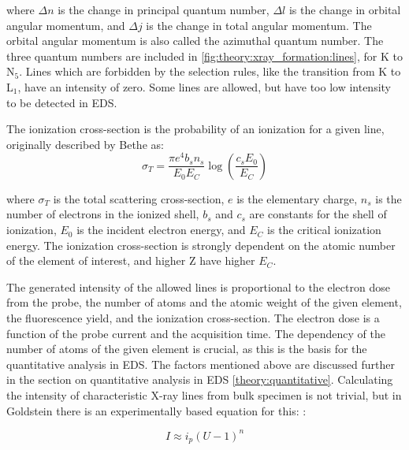 where $\Delta n$ is the change in principal quantum number, $\Delta l$ is the change in orbital angular momentum, and $\Delta j$ is the change in total angular momentum.
The orbital angular momentum is also called the azimuthal quantum number.
The three quantum numbers are included in \cref{fig:theory:xray_formation:lines}, for K to N$_5$.
Lines which are forbidden by the selection rules, like the transition from K to L$_1$, have an intensity of zero.
Some lines are allowed, but have too low intensity to be detected in EDS.


The ionization cross-section is the probability of an ionization for a given line, originally described by Bethe \cite{inokuti_on_bethe_1971} as:
\begin{equation}
    \label{eq:ionizationcrosssection}
    \sigma_T = \frac{\pi e^4 b_s n_s}{E_0 E_C}  \log\left(\frac{c_s E_0}{E_C}\right)
\end{equation}

where $\sigma_T$ is the total scattering cross-section, $e$ is the elementary charge, $n_s$ is the number of electrons in the ionized shell, $b_s$ and $c_s$ are constants for the shell of ionization, $E_0$ is the incident electron energy, and $E_C$ is the critical ionization energy.
The ionization cross-section is strongly dependent on the atomic number of the element of interest, and higher Z have higher $E_C$.


The generated intensity of the allowed lines is proportional to the electron dose from the probe, the number of atoms and the atomic weight of the given element, the fluorescence yield, and the ionization cross-section. %
The electron dose is a function of the probe current and the acquisition time.
The dependency of the number of atoms of the given element is crucial, as this is the basis for the quantitative analysis in EDS.
The factors mentioned above are discussed further in the section on quantitative analysis in EDS \cref{theory:quantitative}.
Calculating the intensity of characteristic X-ray lines from bulk specimen is not trivial, but in Goldstein there is an experimentally based equation for this: \cite[Eq. 4.8]{goldstein_scanning_2018}:

\begin{equation}
    \label{eq:theory:xray_formation:intensity}
    I \approx i_p (U-1)^n
\end{equation}

